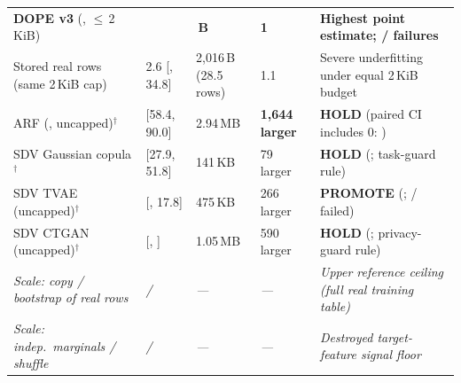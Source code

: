 \documentclass[8.8pt,letterpaper]{article}
\begin{document}
\vspace{2.5pt}
\noindent
{\fontsize{7.5}{9.3}\selectfont\setlength{\tabcolsep}{4pt}
\begin{tabularx}{\textwidth}{@{}L{3.95cm}R{2.70cm}R{2.30cm}R{1.85cm}Y@{}}
\toprule
{} &  &  &  &  \\
\midrule
{}
\textbf{DOPE v3} (, $\le$\,2\,KiB) & \textbf{} & \textbf{\,B} & \textbf{1\x} & \textbf{Highest point estimate; / failures} \\
Stored real rows (same 2\,KiB cap) & 2.6 {\color{sub}[, 34.8]} & 2,016\,B {\color{sub}(28.5 rows)} & 1.1\x & Severe underfitting under equal 2\,KiB budget \\
ARF (, uncapped)$^\dagger$ &  {\color{sub}[58.4, 90.0]} & 2.94\,MB & \textbf{1,644\x{} larger} & \textbf{HOLD} (paired CI includes 0: ) \\
SDV Gaussian copula$^\dagger$ &  {\color{sub}[27.9, 51.8]} & 141\,KB & 79\x{} larger & \textbf{HOLD} (; task-guard rule) \\
SDV TVAE (uncapped)$^\dagger$ &  {\color{sub}[, 17.8]} & 475\,KB & 266\x{} larger & \textbf{PROMOTE} (; / failed) \\
SDV CTGAN (uncapped)$^\dagger$ &  {\color{sub}[, ]} & 1.05\,MB & 590\x{} larger & \textbf{HOLD} (; privacy-guard rule) \\
\midrule
\textit{Scale: copy / bootstrap of real rows} & \textit{ \; / \; } & \textit{---} & \textit{---} & \textit{Upper reference ceiling (full real training table)} \\
\textit{Scale: indep.\ marginals / shuffle} & \textit{ \; / \; } & \textit{---} & \textit{---} & \textit{Destroyed target-feature signal floor} \\
\bottomrule
\end{tabularx}}
\vspace{1.5pt}
\end{document}
